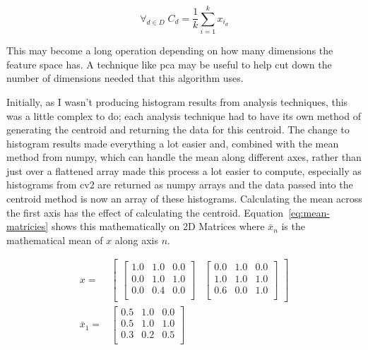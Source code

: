 \begin{equation}
\label{eq:sce}
\forall_{d \in D}\;C_d = \frac{1}{k}\sum^{k}_{i=1}{x_{i_{d}}}
\end{equation}

This may become a long operation depending on how many dimensions the feature space has. A
technique like \gls{pca}\cite{Bacardit2013Largescale} may be useful to help cut down the number of dimensions needed that this
algorithm uses.

Initially, as I wasn't producing histogram results from analysis techniques, this was a little
complex to do; each analysis technique had to have its own method of generating the centroid and
returning the data for this centroid. The change to histogram results made everything a lot easier
and, combined with the mean method from numpy, which can handle the mean along 
different axes, rather than just over a flattened array made this process a lot easier to compute,
especially as histograms from \gls{cv2} are returned as numpy arrays and the data passed into the centroid method is now an 
array of these histograms. Calculating the mean across the first axis has the effect of 
calculating the centroid. Equation~\ref{eq:mean-matricies} shows this mathematically on 2D 
Matrices where $\bar{x}_n$ is the mathematical mean of $x$ along axis $n$.

\begin{align}
x=&\begin{bmatrix}
\begin{bmatrix}
1.0 & 1.0 & 0.0 \\
0.0 & 1.0 & 1.0 \\
0.0 & 0.4 & 0.0 \\
\end{bmatrix} & 
\begin{bmatrix}
0.0 & 1.0 & 0.0 \\
1.0 & 1.0 & 1.0 \\
0.6 & 0.0 & 1.0 \\
\end{bmatrix}
\end{bmatrix} \nonumber \\
\bar{x}_1 =& 
\begin{bmatrix}
0.5 & 1.0 & 0.0 \\
0.5 & 1.0 & 1.0 \\
0.3 & 0.2 & 0.5 \\
\end{bmatrix}
\label{eq:mean-matricies}
\end{align}

